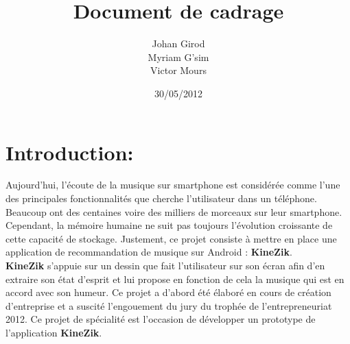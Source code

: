 \documentclass[11pt]{article}
\title{Document de cadrage }
\author{ Johan Girod \\ Myriam G'sim \\ Victor Mours}
\date{30/05/2012}
\begin{document}
\maketitle

\section{Introduction:}
Aujourd'hui, l'écoute de la musique sur smartphone est considérée comme l'une des principales fonctionnalités que cherche l'utilisateur dans un téléphone. Beaucoup ont des centaines voire des milliers de morceaux sur leur smartphone. Cependant, la mémoire humaine ne suit pas toujours l'évolution croissante de cette capacité de stockage. Justement, ce projet consiste à mettre en place une application de recommandation de musique sur Android : \textbf{KineZik}.\\
\textbf{KineZik} s'appuie sur un dessin que fait l'utilisateur sur son écran afin d'en extraire son état d'esprit et lui propose en fonction de cela la musique qui est en accord avec son humeur.
Ce projet a d’abord été élaboré en cours de création d’entreprise et a suscité l’engouement du jury du trophée de l’entrepreneuriat 2012. Ce projet de spécialité est l’occasion de développer un prototype de l’application \textbf{KineZik}. 
\end{document}
